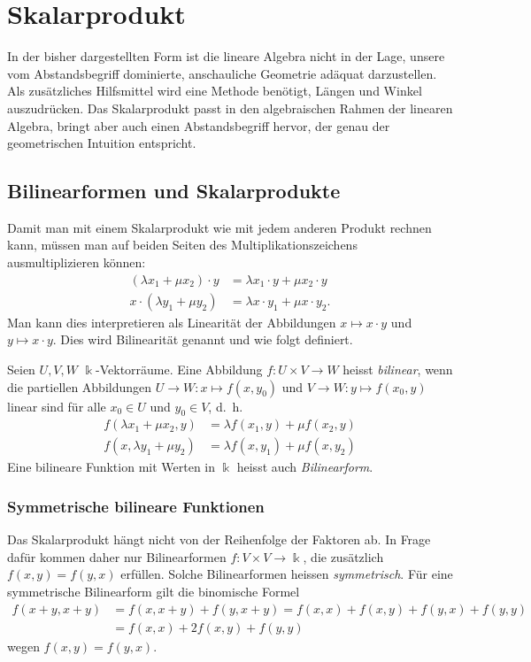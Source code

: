 %
%
%
\section{Skalarprodukt
\label{buch:section:skalarprodukt}}
In der bisher dargestellten Form ist die lineare Algebra nicht
in der Lage, unsere vom Abstandsbegriff dominierte, anschauliche Geometrie
adäquat darzustellen.
Als zusätzliches Hilfsmittel wird eine Methode benötigt, Längen
und Winkel auszudrücken.
Das Skalarprodukt passt in den algebraischen Rahmen der
linearen Algebra, bringt aber auch einen Abstandsbegriff hervor,
der genau der geometrischen Intuition entspricht.

\subsection{Bilinearformen und Skalarprodukte
\label{buch:subsection:bilinearformen}}
Damit man mit einem Skalarprodukt wie mit jedem anderen Produkt
rechnen kann, müssen man auf beiden Seiten des Multiplikationszeichens
ausmultiplizieren können:
\begin{align*}
(\lambda x_1 + \mu x_2)\cdot y &= \lambda x_1\cdot y + \mu x_2\cdot y\\
x\cdot (\lambda y_1 + \mu y_2) &= \lambda x\cdot y_1 + \mu x\cdot y_2.
\end{align*}
Man kann dies interpretieren als Linearität der Abbildungen 
$x\mapsto x\cdot y$ und $y\mapsto x\cdot y$.
Dies wird Bilinearität genannt und wie folgt definiert.

\begin{definition}
Seien $U,V,W$ $\Bbbk$-Vektorräume.
Eine Abbildung $f\colon U\times V\to W$  heisst {\em bilinear},
%
wenn die partiellen Abbildungen $U\to W:x\mapsto f(x,y_0)$ und
$V\to W:y\mapsto f(x_0,y)$
linear sind für alle $x_0\in U$ und $y_0\in V$, d.~h.
\begin{align*}
f(\lambda x_1 + \mu x_2,y) &= \lambda f(x_1,y) + \mu f(x_2,y)
\\
f(x,\lambda y_1 + \mu y_2) &= \lambda f(x,y_1) + \mu f(x,y_2)
\end{align*}
Eine bilineare Funktion mit Werten in $\Bbbk$ heisst auch {\em Bilinearform}.
%
\end{definition}

\subsubsection{Symmetrische bilineare Funktionen}
Das Skalarprodukt hängt nicht von der Reihenfolge der Faktoren ab.
In Frage dafür kommen daher nur Bilinearformen $f\colon V\times V\to\Bbbk$,
die zusätzlich $f(x,y)=f(y,x)$ erfüllen.
Solche Bilinearformen heissen {\em symmetrisch}.
Für eine symmetrische Bilinearform gilt die binomische Formel
\begin{align*}
f(x+y,x+y)
&=
f(x,x+y)+f(y,x+y)
=
f(x,x)+f(x,y)+f(y,x)+f(y,y)
\\
&=
f(x,x)+2f(x,y)+f(y,y)
\end{align*}
wegen $f(x,y)=f(y,x)$.

